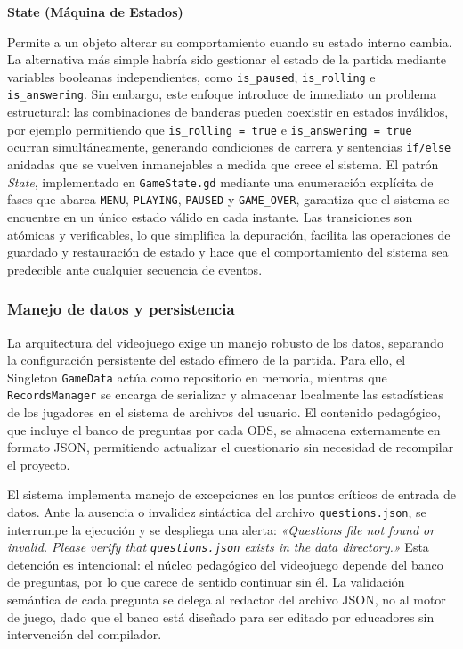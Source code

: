 \textbf{State (Máquina de Estados)}

Permite a un objeto alterar su comportamiento cuando su estado interno cambia. La alternativa más simple habría sido gestionar el estado de la partida mediante variables booleanas independientes, como \texttt{is\_paused}, \texttt{is\_rolling} e \texttt{is\_answering}. Sin embargo, este enfoque introduce de inmediato un problema estructural: las combinaciones de banderas pueden coexistir en estados inválidos, por ejemplo permitiendo que \texttt{is\_rolling = true} e \texttt{is\_answering = true} ocurran simultáneamente, generando condiciones de carrera y sentencias \texttt{if/else} anidadas que se vuelven inmanejables a medida que crece el sistema. El patrón \textit{State}, implementado en \texttt{GameState.gd} mediante una enumeración explícita de fases que abarca \texttt{MENU}, \texttt{PLAYING}, \texttt{PAUSED} y \texttt{GAME\_OVER}, garantiza que el sistema se encuentre en un único estado válido en cada instante. Las transiciones son atómicas y verificables, lo que simplifica la depuración, facilita las operaciones de guardado y restauración de estado y hace que el comportamiento del sistema sea predecible ante cualquier secuencia de eventos.

\subsubsection{Manejo de datos y persistencia}
\label{subsubsec:manejo_datos}

La arquitectura del videojuego exige un manejo robusto de los datos, separando la configuración persistente del estado efímero de la partida. Para ello, el Singleton \texttt{GameData} actúa como repositorio en memoria, mientras que \texttt{RecordsManager} se encarga de serializar y almacenar localmente las estadísticas de los jugadores en el sistema de archivos del usuario. El contenido pedagógico, que incluye el banco de preguntas por cada ODS, se almacena externamente en formato JSON, permitiendo actualizar el cuestionario sin necesidad de recompilar el proyecto.

El sistema implementa manejo de excepciones en los puntos críticos de entrada de datos. Ante la ausencia o invalidez sintáctica del archivo \texttt{questions.json}, se interrumpe la ejecución y se despliega una alerta: \textit{«Questions file not found or invalid. Please verify that \texttt{questions.json} exists in the data directory.»} Esta detención es intencional: el núcleo pedagógico del videojuego depende del banco de preguntas, por lo que carece de sentido continuar sin él. La validación semántica de cada pregunta se delega al redactor del archivo JSON, no al motor de juego, dado que el banco está diseñado para ser editado por educadores sin intervención del compilador.

